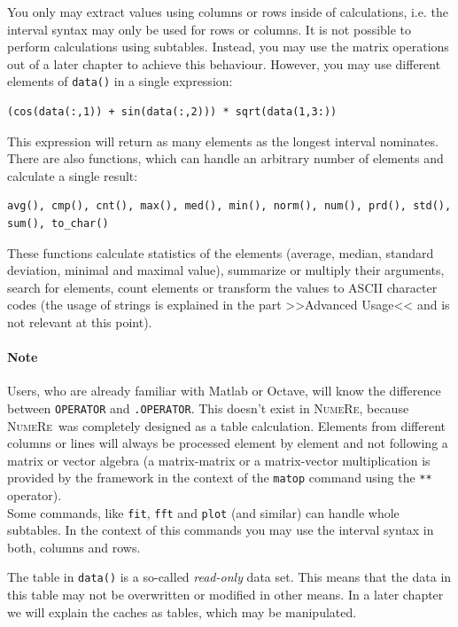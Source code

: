 \documentclass[DIV=14,headsepline,footsepline]{scrbook}
\newcommand{\NR}{\textsc{Nu\-me\-Re}}
\begin{document}
				You only may extract values using columns or rows inside of calculations, i.e. the interval syntax may only be used for rows or columns. It is not possible to perform calculations using subtables. Instead, you may use the matrix operations out of a later chapter to achieve this behaviour. However, you may use different elements of \lstinline+data()+ in a single expression:
				\begin{lstlisting}
(cos(data(:,1)) + sin(data(:,2))) * sqrt(data(1,3:))
				\end{lstlisting}
				This expression will return as many elements as the longest interval nominates. There are also functions, which can handle an arbitrary number of elements and calculate a single result:
				\begin{lstlisting}
avg(), cmp(), cnt(), max(), med(), min(), norm(), num(), prd(), std(), sum(), to_char()
				\end{lstlisting}
				These functions calculate statistics of the elements (average, median, standard deviation, minimal and maximal value), summarize or multiply their arguments, search for elements, count elements or transform the values to ASCII character codes (the usage of strings is explained in the part >>Advanced Usage<< and is not relevant at this point).
				
				\paragraph{Note}
					Users, who are already familiar with Matlab or Octave, will know the difference between \lstinline+OPERATOR+ and \lstinline+.OPERATOR+. This doesn't exist in \NR, because \NR\ was completely designed as a table calculation. Elements from different columns or lines will always be processed element by element and not following a matrix or vector algebra (a matrix-matrix or a matrix-vector multiplication is provided by the framework in the context of the \lstinline+matop+ command using the \lstinline+**+ operator).\bigskip\\
				Some commands, like \lstinline+fit+, \lstinline+fft+ and \lstinline+plot+ (and similar) can handle whole subtables. In the context of this commands you may use the interval syntax in both, columns and rows.
				
				The table in \lstinline+data()+ is a so-called \emph{read-only} data set. This means that the data in this table may not be overwritten or modified in other means. In a later chapter we will explain the caches as tables, which may be manipulated.
				
\end{document}
